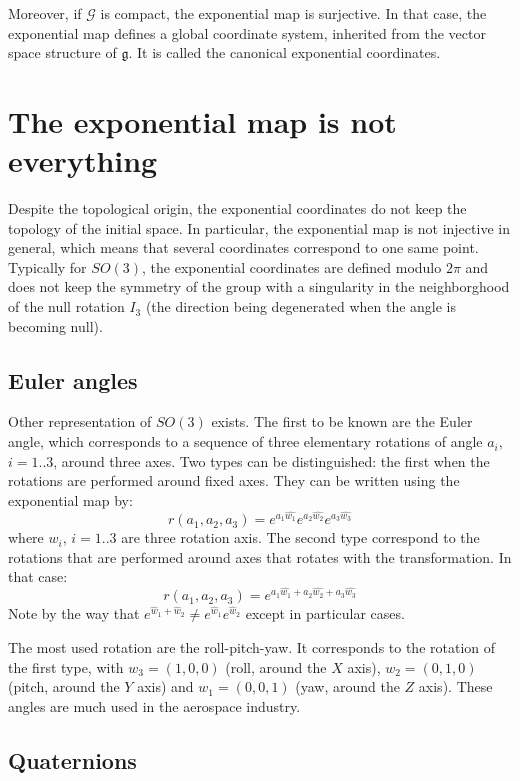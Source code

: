 \documentclass{book}
\begin{document}
Moreover, if $\mathcal{G}$ is compact, the exponential map is surjective. In that case, the exponential map defines a global coordinate system, inherited from the vector space structure of $\mathfrak{g}$. It is called the canonical exponential coordinates.

\section{The exponential map is not everything}

Despite the topological origin, the exponential coordinates do not keep the topology of the initial space. In particular, the exponential map is not injective in general, which means that several coordinates correspond to one same point. Typically for $SO(3)$, the exponential coordinates are defined modulo $2 \pi$ and does not keep the symmetry of the group with a singularity in the neighborghood of the null rotation $I_3$ (the direction being degenerated when the angle is becoming null).

\subsection{Euler angles}
Other representation of $SO(3)$ exists. The first to be known are the Euler angle, which corresponds to a sequence of three elementary rotations of angle $a_i$, $i=1..3$, around three axes. Two types can be distinguished: the first when the rotations are performed around fixed axes. They can be written using the exponential map by:
\[ r(a_1,a_2,a_3) = e^{a_1 \hat{w_1}} e^{a_2 \hat{w_2}} e^{a_3\hat{w_3}} \]
where $w_i$, $i=1..3$ are three rotation axis.
The second type correspond to the rotations that are performed around axes that rotates with the transformation. In that case:
\[ r(a_1,a_2,a_3) = e^{a_1 \hat{w_1} + a_2 \hat{w_2} + a_3\hat{w_3}} \]
Note by the way that $e^{\hat w_1 + \hat w_2} \neq e^{\hat w_1}e^{\hat w_2}$ except in particular cases.

The most used rotation are the roll-pitch-yaw. It corresponds to the rotation of the first type, with $w_3 = (1,0,0)$ (roll, around the $X$ axis), $w_2 = (0,1,0)$ (pitch, around the $Y$ axis) and $w_1 = (0,0,1)$ (yaw, around the $Z$ axis). These angles are much used in the aerospace industry.

\subsection{Quaternions}
\end{document}
